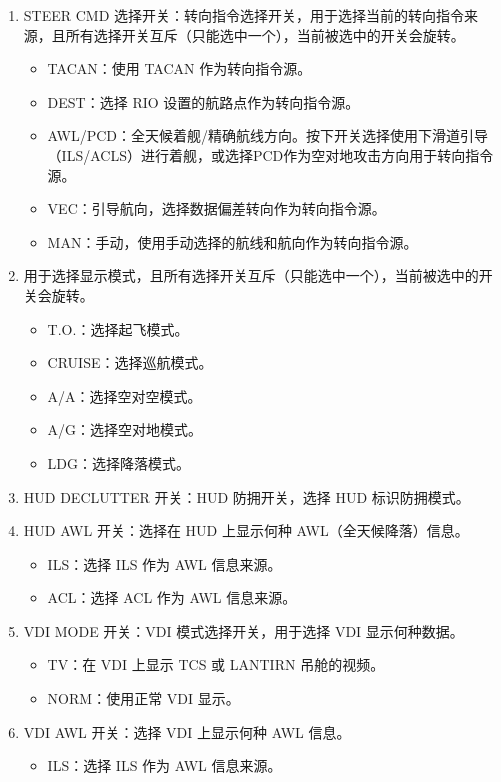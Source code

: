 \begin{enumerate}
  \item STEER CMD 选择开关：转向指令选择开关，用于选择当前的转向指令来源，且所有选择开关互斥（只能选中一个），当前被选中的开关会旋转。
  \begin{itemize}
    \item TACAN：使用 TACAN 作为转向指令源。
    \item DEST：选择 RIO 设置的航路点作为转向指令源。
    \item AWL/PCD：全天候着舰/精确航线方向。按下开关选择使用下滑道引导（ILS/ACLS）进行着舰，或选择PCD作为空对地攻击方向用于转向指令源。
    \item VEC：引导航向，选择数据偏差转向作为转向指令源。
    \item MAN：手动，使用手动选择的航线和航向作为转向指令源。
  \end{itemize}
  \item 用于选择显示模式，且所有选择开关互斥（只能选中一个），当前被选中的开关会旋转。
  \begin{itemize}
    \item T.O.：选择起飞模式。
    \item CRUISE：选择巡航模式。
    \item A/A：选择空对空模式。
    \item A/G：选择空对地模式。
    \item LDG：选择降落模式。
  \end{itemize}
  \item HUD DECLUTTER 开关：HUD 防拥开关，选择 HUD 标识防拥模式。
  \item HUD AWL 开关：选择在 HUD 上显示何种 AWL（全天候降落）信息。
  \begin{itemize}
    \item ILS：选择 ILS 作为 AWL 信息来源。
    \item ACL：选择 ACL 作为 AWL 信息来源。
  \end{itemize}
  \item VDI MODE 开关：VDI 模式选择开关，用于选择 VDI 显示何种数据。
  \begin{itemize}
    \item TV：在 VDI 上显示 TCS 或 LANTIRN 吊舱的视频。
    \item NORM：使用正常 VDI 显示。
  \end{itemize}
  \item VDI AWL 开关：选择 VDI 上显示何种 AWL 信息。
  \begin{itemize}
    \item ILS：选择 ILS 作为 AWL 信息来源。

\end{itemize}
\end{enumerate}
